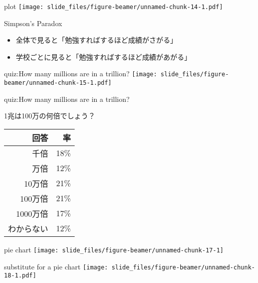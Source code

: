 \documentclass[
  ignorenonframetext,
]{beamer}
\providecommand{\tightlist}{%
  \setlength{\itemsep}{0pt}\setlength{\parskip}{0pt}}
\begin{document}
\begin{frame}{plot}
\protect\hypertarget{plot-7}{}
\texttt{[image: slide\_files/figure-beamer/unnamed-chunk-14-1.pdf]}
\end{frame}

\begin{frame}{Simpson's Paradox}
\protect\hypertarget{simpsons-paradox}{}
\large

\begin{itemize}[<+->]
\tightlist
\item
  \textbullet{}\hspace{2pt}全体で見ると「勉強すればするほど成績がさがる」
\item
  \textbullet{}\hspace{2pt}学校ごとに見ると「勉強すればするほど成績があがる」
\end{itemize}

\normalsize
\end{frame}

\begin{frame}{quiz:How many millions are in a trillion?}
\protect\hypertarget{quizhow-many-millions-are-in-a-trillion}{}
\texttt{[image: slide\_files/figure-beamer/unnamed-chunk-15-1.pdf]}
\end{frame}

\begin{frame}{quiz:How many millions are in a trillion?}
\protect\hypertarget{quizhow-many-millions-are-in-a-trillion-1}{}
\LARGE

1兆は100万の何倍でしょう？

\begin{tabular}{rr}\toprule
回答&率\\\midrule
千倍&18\%\\
万倍&12\%\\
10万倍&21\%\\
100万倍&21\%\\
1000万倍&17\%\\
わからない&12\%\\\bottomrule
\end{tabular}
\end{frame}

\begin{frame}{pie chart}
\protect\hypertarget{pie-chart}{}
\texttt{[image: slide\_files/figure-beamer/unnamed-chunk-17-1]}
\end{frame}

\begin{frame}{substitute for a pie chart}
\protect\hypertarget{substitute-for-a-pie-chart}{}
\texttt{[image: slide\_files/figure-beamer/unnamed-chunk-18-1.pdf]}
\end{frame}
\end{document}
